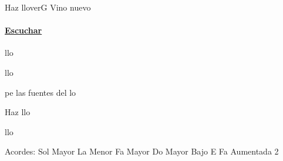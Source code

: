 \documentclass[12pt, spanish]{book}
\begin{document}
    \begin{song}{Haz llover}{G}
    {} %
    {Vino nuevo}
    {} %
    {}
        \ifChordBk
        \paragraph{\mbox{}\hfill\protect\href{https://open.spotify.com/intl-es/track/5QcC5tFnqsNOjxksGXZHCB}{Escuchar}\mbox{}\hfill}
        \fi

        \begin{SBOpGroup}
             llo

             llo
        \end{SBOpGroup}

        \begin{SBChorus}
            pe las fuentes del lo

            Haz llo

             llo
        \end{SBChorus}

        \ifChordBk
        \begin{SBOpGroup}
            Acordes:
            \upchord{\G}\qquad Sol Mayor \hfill
            \upchord{\Am}\qquad La Menor \hfill\null\break
            \upchord{\F}\qquad Fa Mayor \hfill
            \upchord{\CE}\qquad Do Mayor Bajo E \hfill\null\break
            \upchord{\Ftwo}Fa Aumentada 2 \hfill\null\break
        \end{SBOpGroup}
        \fi
    \end{song}
\end{document}
